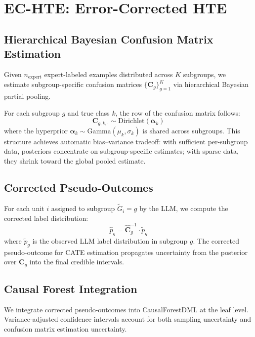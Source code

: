 \documentclass[11pt,a4paper]{article}
\begin{document}
\section{EC-HTE: Error-Corrected HTE}
\label{sec:method}

\subsection{Hierarchical Bayesian Confusion Matrix Estimation}

Given $n_{\text{expert}}$ expert-labeled examples distributed across $K$ subgroups, we estimate subgroup-specific confusion matrices $\{\mathbf{C}_g\}_{g=1}^K$ via hierarchical Bayesian partial pooling.

For each subgroup $g$ and true class $k$, the row of the confusion matrix follows:
\begin{equation}
\mathbf{C}_{g,k,\cdot} \sim \text{Dirichlet}(\boldsymbol{\alpha}_{k})
\end{equation}
where the hyperprior $\boldsymbol{\alpha}_k \sim \text{Gamma}(\mu_k, \sigma_k)$ is shared across subgroups.
This structure achieves automatic bias--variance tradeoff: with sufficient per-subgroup data, posteriors concentrate on subgroup-specific estimates; with sparse data, they shrink toward the global pooled estimate.

\subsection{Corrected Pseudo-Outcomes}

For each unit $i$ assigned to subgroup $\tilde{G}_i = g$ by the LLM, we compute the corrected label distribution:
\begin{equation}
\hat{p}_g = \hat{\mathbf{C}}_g^{-1} \cdot \tilde{p}_g
\end{equation}
where $\tilde{p}_g$ is the observed LLM label distribution in subgroup $g$.
The corrected pseudo-outcome for CATE estimation propagates uncertainty from the posterior over $\mathbf{C}_g$ into the final credible intervals.

\subsection{Causal Forest Integration}

We integrate corrected pseudo-outcomes into CausalForestDML \citep{athey2019estimating} at the leaf level.
Variance-adjusted confidence intervals account for both sampling uncertainty and confusion matrix estimation uncertainty.
\end{document}
